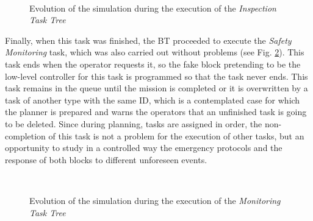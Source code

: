 \begin{figure}[htbp]
    \centering
    \hfill
    \\
        \hfill
    \caption{Evolution of the simulation during the execution of the \emph{Inspection Task Tree}}
    \label{fig:Gazebo_InspectTree}
\end{figure}

Finally, when this task was finished, the \gls{BT} proceeded to execute the \emph{Safety Monitoring} task, which was also carried out without problems (see Fig. \ref{fig:Gazebo_MonitorTree}). This task ends when the operator requests it, so the fake block pretending to be the low-level controller for this task is programmed so that the task never ends. This task remains in the queue until the mission is completed or it is overwritten by a task of another type with the same \gls{ID}, which is a contemplated case for which the planner is prepared and warns the operators that an unfinished task is going to be deleted. Since during planning, tasks are assigned in order, the non-completion of this task is not a problem for the execution of other tasks, but an opportunity to study in a controlled way the emergency protocols and the response of both blocks to different unforeseen events.

\begin{figure}[htbp]
    \centering
    \hfill
    \\
        \hfill
    \caption{Evolution of the simulation during the execution of the \emph{Monitoring Task Tree}}
    \label{fig:Gazebo_MonitorTree}
\end{figure}

